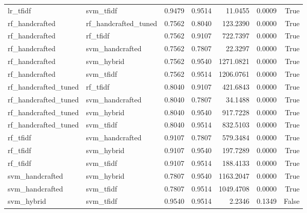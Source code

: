 \begin{table}
\begin{tabular}{llrrrrr}
lr_tfidf & svm_tfidf & 0.9479 & 0.9514 & 11.0455 & 0.0009 & True \\
rf_handcrafted & rf_handcrafted_tuned & 0.7562 & 0.8040 & 123.2390 & 0.0000 & True \\
rf_handcrafted & rf_tfidf & 0.7562 & 0.9107 & 722.7397 & 0.0000 & True \\
rf_handcrafted & svm_handcrafted & 0.7562 & 0.7807 & 22.3297 & 0.0000 & True \\
rf_handcrafted & svm_hybrid & 0.7562 & 0.9540 & 1271.0821 & 0.0000 & True \\
rf_handcrafted & svm_tfidf & 0.7562 & 0.9514 & 1206.0761 & 0.0000 & True \\
rf_handcrafted_tuned & rf_tfidf & 0.8040 & 0.9107 & 421.6843 & 0.0000 & True \\
rf_handcrafted_tuned & svm_handcrafted & 0.8040 & 0.7807 & 34.1488 & 0.0000 & True \\
rf_handcrafted_tuned & svm_hybrid & 0.8040 & 0.9540 & 917.7228 & 0.0000 & True \\
rf_handcrafted_tuned & svm_tfidf & 0.8040 & 0.9514 & 832.5103 & 0.0000 & True \\
rf_tfidf & svm_handcrafted & 0.9107 & 0.7807 & 579.3484 & 0.0000 & True \\
rf_tfidf & svm_hybrid & 0.9107 & 0.9540 & 197.7289 & 0.0000 & True \\
rf_tfidf & svm_tfidf & 0.9107 & 0.9514 & 188.4133 & 0.0000 & True \\
svm_handcrafted & svm_hybrid & 0.7807 & 0.9540 & 1163.2047 & 0.0000 & True \\
svm_handcrafted & svm_tfidf & 0.7807 & 0.9514 & 1049.4708 & 0.0000 & True \\
svm_hybrid & svm_tfidf & 0.9540 & 0.9514 & 2.2346 & 0.1349 & False \\
\bottomrule
\end{tabular}
\end{table}
